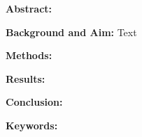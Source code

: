 
\clearpage
\thispagestyle{empty}
\begin{latin}
\begin{center}

\vspace{1.5cm}

{\bfseries\fontsize{14}{18}\selectfont Abstract:}

\end{center}

\vspace{0.5cm}

\hspace*{0.5cm}\fontsize{12}{16}\selectfont\textbf{Background and Aim:}
Text
\par

\hspace*{0.5cm}\fontsize{12}{16}\selectfont\textbf{Methods:}

\par

\hspace*{0.5cm}\fontsize{12}{16}\selectfont\textbf{Results:}

\par

\hspace*{0.5cm}\fontsize{12}{16}\selectfont\textbf{Conclusion:}

\par

\hspace*{0.5cm}\fontsize{12}{16}\selectfont\textbf{Keywords:} \KeywordsEN

\end{latin}

\clearpage
